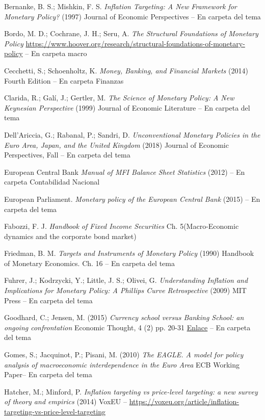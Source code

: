 \documentclass{nuevotema}
\begin{document}
Bernanke, B. S.; Mishkin, F. S. \textit{Inflation Targeting: A New Framework for Monetary Policy?} (1997) Journal of Economic Perspectives -- En carpeta del tema

Bordo, M. D.; Cochrane, J. H.; Seru, A. \textit{The Structural Foundations of Monetary Policy} \url{https://www.hoover.org/research/structural-foundations-of-monetary-policy} -- En carpeta macro

Cecchetti, S.; Schoenholtz, K. \textit{Money, Banking, and Financial Markets} (2014) Fourth Edition -- En carpeta Finanzas

Clarida, R.; Galí, J.; Gertler, M. \textit{The Science of Monetary Policy: A New Keynesian Perspective} (1999) Journal of Economic Literature -- En carpeta del tema

Dell'Ariccia, G.; Rabanal, P.; Sandri, D. \textit{Unconventional Monetary Policies in the Euro Area, Japan, and the United Kingdom} (2018) Journal of Economic Perspectives, Fall -- En carpeta del tema

European Central Bank \textit{Manual of MFI Balance Sheet Statistics} (2012) -- En carpeta Contabilidad Nacional

European Parliament. \textit{Monetary policy of the European Central Bank} (2015) -- En carpeta del tema

Fabozzi, F. J. \textit{Handbook of Fixed Income Securities} Ch. 5(Macro-Economic dynamics and the corporate bond market)

Friedman, B. M. \textit{Targets and Instruments of Monetary Policy} (1990) Handbook of Monetary Economics. Ch. 16 -- En carpeta del tema

Fuhrer, J.; Kodrzycki, Y.; Little, J. S.; Olivei, G. \textit{Understanding Inflation and Implications for Monetary Policy: A Phillips Curve Retrospective} (2009) MIT Press -- En carpeta del tema

Goodhard, C.; Jensen, M. (2015) \textit{Currency school versus Banking School: an ongoing confrontation} Economic Thought, 4 (2) pp. 20-31 \href{http://eprints.lse.ac.uk/64068/1/Currency\%20School\%20versus\%20Banking\%20School.pdf}{Enlace} -- En carpeta del tema

Gomes, S.; Jacquinot, P.; Pisani, M. (2010) \textit{The EAGLE. A model for policy analysis of macroeconomic interdependence in the Euro Area} ECB Working Paper-- En carpeta del tema

Hatcher, M.; Minford, P. \textit{Inflation targeting vs price-level targeting: a new survey of theory and empirics} (2014) VoxEU -- \url{https://voxeu.org/article/inflation-targeting-vs-price-level-targeting}
\end{document}
